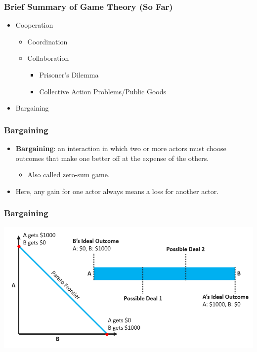 \documentclass[handout]{beamer}
\begin{document}
\begin{frame} 
	\frametitle{\LARGE{Brief Summary of Game Theory (So Far)}}
	\begin{itemize}
		\item Cooperation
		\begin{itemize}
			\item Coordination
			\item Collaboration
			\begin{itemize}
				\item Prisoner's Dilemma
				\item Collective Action Problems/Public Goods
			\end{itemize}
		\end{itemize}
		\item Bargaining
	\end{itemize}
\end{frame}

\begin{frame} 
	\frametitle{\LARGE{Bargaining}}
	\begin{itemize}
	\item \textbf{Bargaining}: an interaction in which two or more actors must choose outcomes that make one better off at the expense of the others.
	\begin{itemize}
		\item Also called zero-sum game.
	\end{itemize}
	\item Here, any gain for one actor always means a loss for another actor.
		\end{itemize}
\end{frame}

\begin{frame} 
	\frametitle{\LARGE{Bargaining}}
	\centering
	\includegraphics[width=\textwidth,height=0.9\textheight,keepaspectratio]{Bargaining.png}
\end{frame}
\end{document}
